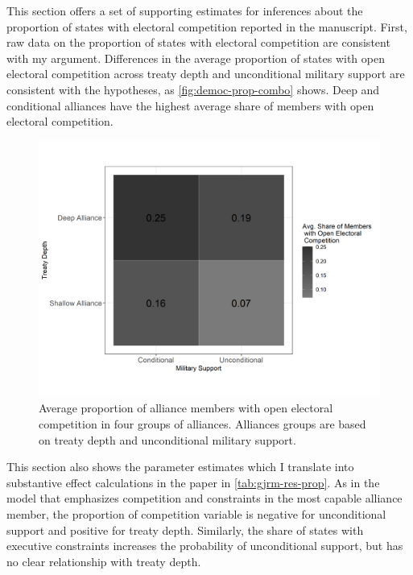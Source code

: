\documentclass[12pt]{article}
\begin{document}
This section offers a set of supporting estimates for inferences about the proportion of states with electoral competition reported in the manuscript. 
First, raw data on the proportion of states with electoral competition are consistent with my argument. 
Differences in the average proportion of states with open electoral competition across treaty depth and unconditional military support are consistent with the hypotheses, as \autoref{fig:democ-prop-combo} shows.
Deep and conditional alliances have the highest average share of members with open electoral competition.


\begin{figure}
\includegraphics[width=.95\textwidth]{democ-prop-combo.png}  
\caption{Average proportion of alliance members with open electoral competition in four groups of alliances. Alliances groups are based on treaty depth and unconditional military support.}
\label{fig:democ-prop-combo}
\end{figure}


This section also shows the parameter estimates which I translate into substantive effect calculations in the paper in \autoref{tab:gjrm-res-prop}. 
As in the model that emphasizes competition and constraints in the most capable alliance member, the proportion of competition variable is negative for unconditional support and positive for treaty depth. 
Similarly, the share of states with executive constraints increases the probability of unconditional support, but has no clear relationship with treaty depth. 
\end{document}
